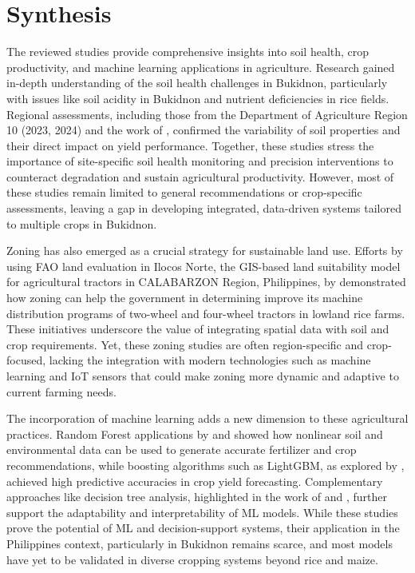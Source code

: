 {	\section{Synthesis}
	The reviewed studies provide comprehensive insights into soil health, crop productivity, and machine learning applications in agriculture. Research gained in-depth understanding of the soil health challenges in Bukidnon, particularly with issues like soil acidity in Bukidnon and nutrient deficiencies in rice fields. Regional assessments, including those from the Department of Agriculture Region 10 (2023, 2024) and the work of \cite{Temario2024}, confirmed the variability of soil properties and their direct impact on yield performance. Together, these studies stress the importance of site-specific soil health monitoring and precision interventions to counteract degradation and sustain agricultural productivity. However, most of these studies remain limited to general recommendations or crop-specific assessments, leaving a gap in developing integrated, data-driven systems tailored to multiple crops in Bukidnon.
	
	Zoning has also emerged as a crucial strategy for sustainable land use. Efforts by \cite{Watson2025} using FAO land evaluation in Ilocos Norte, the GIS-based land suitability model for agricultural tractors in CALABARZON Region, Philippines, by \cite{Amongo2023} demonstrated how zoning can help the government in determining improve its machine distribution programs of two-wheel and four-wheel tractors in lowland rice farms. These initiatives underscore the value of integrating spatial data with soil and crop requirements. Yet, these zoning studies are often region-specific and crop-focused, lacking the integration with modern technologies such as machine learning and IoT sensors that could make zoning more dynamic and adaptive to current farming needs.
	
	The incorporation of machine learning adds a new dimension to these agricultural practices. Random Forest applications by \cite{Sani2023CropRS} and \cite{Islam2023} showed how nonlinear soil and environmental data can be used to generate accurate fertilizer and crop recommendations, while boosting algorithms such as LightGBM, as explored by \cite{Parganiha2024}, achieved high predictive accuracies in crop yield forecasting. Complementary approaches like decision tree analysis, highlighted in the work of \cite{Lavanya2024} and \cite{Sudha2022}, further support the adaptability and interpretability of ML models. While these studies prove the potential of ML and decision-support systems, their application in the Philippines context, particularly in Bukidnon remains scarce, and most models have yet to be validated in diverse cropping systems beyond rice and maize.
	
}
